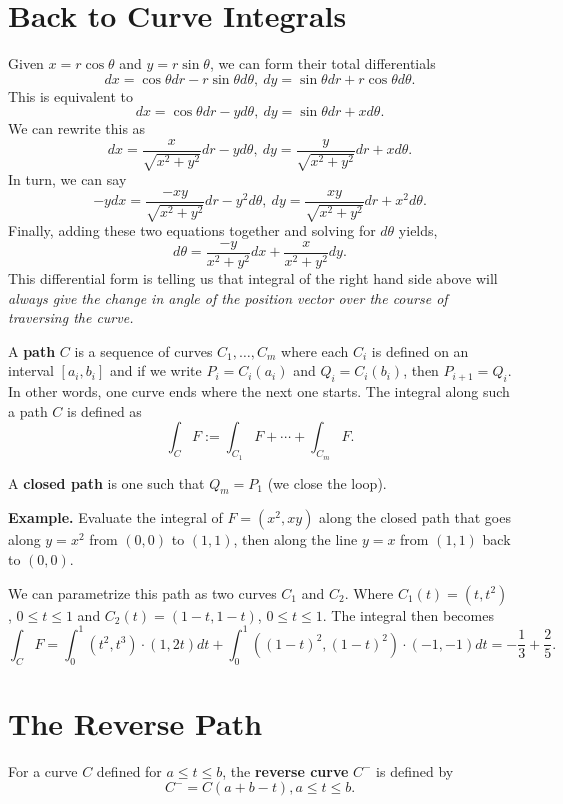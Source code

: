 \documentclass{article}
\begin{document}
\section*{Back to Curve Integrals}
Given $x = r\cos\theta$ and $y = r\sin\theta$, we can form their total differentials
\[dx = \cos\theta dr - r \sin\theta d\theta,\ dy = \sin\theta dr + r\cos\theta d\theta.\]
This is equivalent to 
\[dx = \cos\theta dr - yd\theta,\ dy = \sin\theta dr + x d\theta.\]
We can rewrite this as 
\[dx = \frac{x}{\sqrt{x^2+y^2}}dr - yd\theta,\ dy = \frac{y}{\sqrt{x^2+y^2}}dr + x d\theta.\]
In turn, we can say
\[-ydx = \frac{-xy}{\sqrt{x^2+y^2}}dr - y^2d\theta,\ dy = \frac{xy}{\sqrt{x^2+y^2}}dr + x^2 d\theta.\]
Finally, adding these two equations together and solving for $d\theta$ yields,
\[d\theta = \frac{-y}{x^2+y^2}dx + \frac{x}{x^2+y^2}dy. \]
This differential form is telling us that integral of the right hand side above will \emph{always give the change in angle
of the position vector over the course of traversing the curve.}

A \textbf{path} $C$ is a sequence of curves $C_1, \ldots, C_m$ where each $C_i$ is defined on an interval
$[a_i,b_i]$ and if we write $P_i = C_i(a_i)$ and $Q_i = C_i(b_i)$, then $P_{i+1}=Q_i$. In other words, one curve
ends where the next one starts. The integral along such a path $C$ is defined as 
\[\int_C F := \int_{C_1} F + \cdots + \int_{C_m} F.\]

A \textbf{closed path} is one such that $Q_m = P_1$ (we close the loop).

\textbf{Example.} Evaluate the integral of $F = (x^2,xy)$ along the closed path that goes along $y=x^2$ from
$(0,0)$ to $(1,1)$, then along the line $y=x$ from $(1,1)$ back to $(0,0)$. 

We can parametrize this path as two curves $C_1$ and $C_2$. Where $C_1(t) = (t,t^2)$, $0 \leq t \leq 1$
and $C_2(t) = (1-t, 1-t)$, $0 \leq t \leq 1$. The integral then becomes
\[\int_C F = \int_{0}^1 (t^2, t^3)\cdot(1, 2t)dt + \int_0^1 ((1-t)^2, (1-t)^2)\cdot(-1,-1)dt = -\frac{1}{3} + \frac{2}{5}.\]

\section*{The Reverse Path}

For a curve $C$ defined for $a\leq t \leq b$, the \textbf{reverse curve} $C^-$ is defined by 
\[C^- = C(a+b-t), a \leq t \leq b.\]
\end{document}

